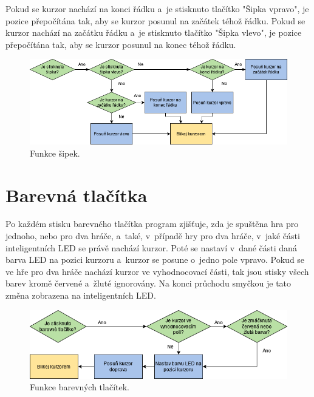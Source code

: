 Pokud se kurzor nachází na konci řádku a~je stisknuto tlačítko "Šipka vpravo", je pozice přepočítána tak, aby se kurzor posunul na 
začátek téhož řádku. Pokud se kurzor nachází na začátku řádku a~je stisknuto tlačítko "Šipka vlevo", je pozice přepočítána tak, aby se kurzor 
posunul na konec téhož řádku. 

  \begin{figure}[!h]
    \begin{center}
      \includegraphics[scale=0.6]{obrazky/Sipka.png}
    \end{center}
    \caption[Funkce šipek]{Funkce šipek.}
  \end{figure}
    
\section{Barevná tlačítka}
Po každém stisku barevného tlačítka program zjišťuje, zda je spuštěna hra pro jednoho, nebo pro dva hráče, a~také, v~případě hry pro dva hráče,
v~jaké části inteligentních LED se právě nachází kurzor. Poté se nastaví v~dané části daná barva LED na pozici kurzoru a~kurzor se posune
o~jedno pole vpravo. Pokud se ve hře pro dva hráče nachází kurzor ve vyhodnocovací části, tak jsou stisky všech barev kromě červené a~žluté 
ignorovány. Na konci průchodu smyčkou je tato změna zobrazena na inteligentních LED. 

  \begin{figure}[!h]
    \begin{center}
      \includegraphics[scale=0.6]{obrazky/Barevne_tlacitko.png}
    \end{center}
    \caption[Funkce barevných tlačítek]{Funkce barevných tlačítek.}
  \end{figure}

